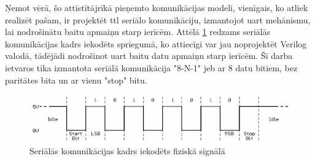 Ņemot vērā, šo attīstītājrīkā pieņemto komunikācijas modeli, vienīgais, ko
atliek realizēt pašam, ir projektēt \gls{ttl} seriālo komunikāciju, izmantojot
\gls{uart} mehānismu, lai nodrošinātu baitu apmaiņu starp ierīcēm. Attēlā
\ref{fig:serialframe} redzams seriālās komunikācijas kadrs iekodēts spriegumā,
ko attiecīgi var jau noprojektēt Verilog valodā, tādējādi nodrošinot
 \gls{uart} baitu datu apmaiņu starp ierīcēm.
Šī darba ietvaros tika izmantota seriālā komunikācija "8-N-1" jeb ar 8 datu
bitiem, bez paritātes bita un ar vienu "stop" bitu.

\begin{figure}[H]
    \includegraphics[width=0.7\linewidth]{assets/ttl-serial-gray.png}
    \centering
    \caption{Seriālās komunikācijas kadrs iekodēts fiziskā signālā}
    \label{fig:serialframe}
\end{figure}

